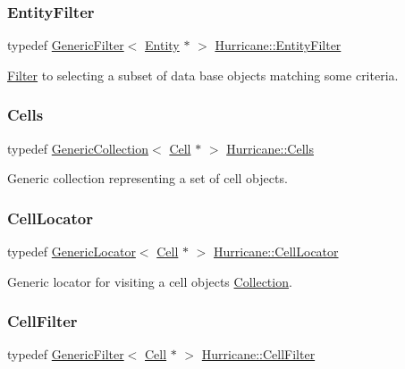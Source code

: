 \subsubsection{\texorpdfstring{Entity\+Filter}{EntityFilter}}
{\footnotesize\ttfamily typedef \mbox{\hyperlink{classHurricane_1_1GenericFilter}{Generic\+Filter}}$<$ \mbox{\hyperlink{classHurricane_1_1Entity}{Entity}} $\ast$ $>$ \mbox{\hyperlink{namespaceHurricane_af0fe741a1ef28dedcb26bf979b1dea5c}{Hurricane\+::\+Entity\+Filter}}}

\mbox{\hyperlink{classHurricane_1_1Filter}{Filter}} to selecting a subset of data base objects matching some criteria. \mbox{\label{namespaceHurricane_a8b4ab14b26f36f43d83a50294410b44a}} 
\subsubsection{\texorpdfstring{Cells}{Cells}}
{\footnotesize\ttfamily typedef \mbox{\hyperlink{classHurricane_1_1GenericCollection}{Generic\+Collection}}$<$ \mbox{\hyperlink{classHurricane_1_1Cell}{Cell}} $\ast$ $>$ \mbox{\hyperlink{namespaceHurricane_a8b4ab14b26f36f43d83a50294410b44a}{Hurricane\+::\+Cells}}}

Generic collection representing a set of cell objects. \mbox{\label{namespaceHurricane_abd99adab3b5944a4d1ace3d0b0b34f57}} 
\subsubsection{\texorpdfstring{Cell\+Locator}{CellLocator}}
{\footnotesize\ttfamily typedef \mbox{\hyperlink{classHurricane_1_1GenericLocator}{Generic\+Locator}}$<$ \mbox{\hyperlink{classHurricane_1_1Cell}{Cell}} $\ast$ $>$ \mbox{\hyperlink{namespaceHurricane_abd99adab3b5944a4d1ace3d0b0b34f57}{Hurricane\+::\+Cell\+Locator}}}

Generic locator for visiting a cell objects \mbox{\hyperlink{classHurricane_1_1Collection}{Collection}}. \mbox{\label{namespaceHurricane_addb0e9cd376680ecea4966516694b799}} 
\subsubsection{\texorpdfstring{Cell\+Filter}{CellFilter}}
{\footnotesize\ttfamily typedef \mbox{\hyperlink{classHurricane_1_1GenericFilter}{Generic\+Filter}}$<$ \mbox{\hyperlink{classHurricane_1_1Cell}{Cell}} $\ast$ $>$ \mbox{\hyperlink{namespaceHurricane_addb0e9cd376680ecea4966516694b799}{Hurricane\+::\+Cell\+Filter}}}

